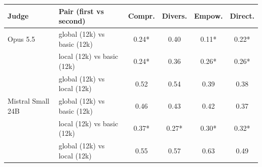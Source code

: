 \begin{tabular}{llcccc}
\toprule
Judge & Pair (first vs second) & Compr. & Divers. & Empow. & Direct. \\
\midrule
Opus 5.5 & global (12k) vs basic (12k) & 0.24* & 0.40 & 0.11* & 0.22* \\
 & local (12k) vs basic (12k) & 0.24* & 0.36 & 0.26* & 0.26* \\
 & global (12k) vs local (12k) & 0.52 & 0.54 & 0.39 & 0.38 \\
Mistral Small 24B & global (12k) vs basic (12k) & 0.46 & 0.43 & 0.42 & 0.37 \\
 & local (12k) vs basic (12k) & 0.37* & 0.27* & 0.30* & 0.32* \\
 & global (12k) vs local (12k) & 0.55 & 0.57 & 0.63 & 0.49 \\
\bottomrule
\end{tabular}
